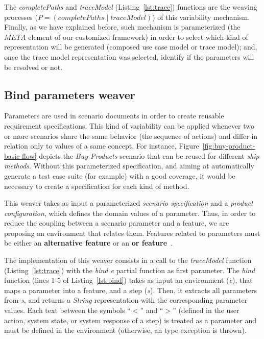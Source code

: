 The \emph{completePaths} and \emph{traceModel}
(Listing~\ref{lst:trace}) functions are the weaving processes ($P =
(completePaths \mid traceModel)$) of this variability mechanism.
Finally, as we have explained before, such mechanism is
parameterized (the $META$ element of our customized framework) in
order to select which kind of representation will be generated
(composed use case model or trace model); and, once the trace model
representation was selected, identify if the parameters will be
resolved or not.



\subsection{Bind parameters weaver}\label{sub:bind-weaver}

Parameters are used in scenario documents in order to create reusable
requirement specifications. This kind of variability can be applied
whenever two or more scenarios share the same behavior (the sequence
of actions) and differ in relation only to values of a same concept.
For instance, Figure~\ref{fig:buy-product-basic-flow} depicts the \emph{Buy Products} 
scenario that can be reused for different \emph{ship methods}. Without this
parameterized specification, and aiming at automatically generate a test case suite (for example) with a good coverage, 
it would be necessary to create a specification for each kind of method.

This weaver takes as input a parameterized \emph{scenario specification} and a
\emph{product configuration}, which defines the domain values of a
parameter. Thus, in order to reduce the coupling between a scenario parameter 
and a feature, we are proposing an environment that
relates them. Features related to parameters 
must be either an {\bf alternative feature} or an {\bf or
feature}~\cite{gheyi-alloy-06,czarnecki-wsfactory-2005,czarnecki-book}.

The implementation of this weaver consists in a call to 
the \emph{traceModel} function (Listing~\ref{lst:trace}) with
the \emph{bind e} partial function as first parameter. The
\emph{bind} function (lines 1-5 of Listing~\ref{lst:bind}) takes as
input an environment (\emph{e}), that maps a parameter into a
feature, and a step (\emph{s}). Then, it extracts all parameters
from \emph{s}, and returns a \emph{String} representation with the
corresponding parameter values. Each text between the symbols ``$<$'' and ``$>$''
(defined in the user action, system state, or system response of a
step) is treated as a parameter and must be defined in the
environment (otherwise, an type exception is thrown).

